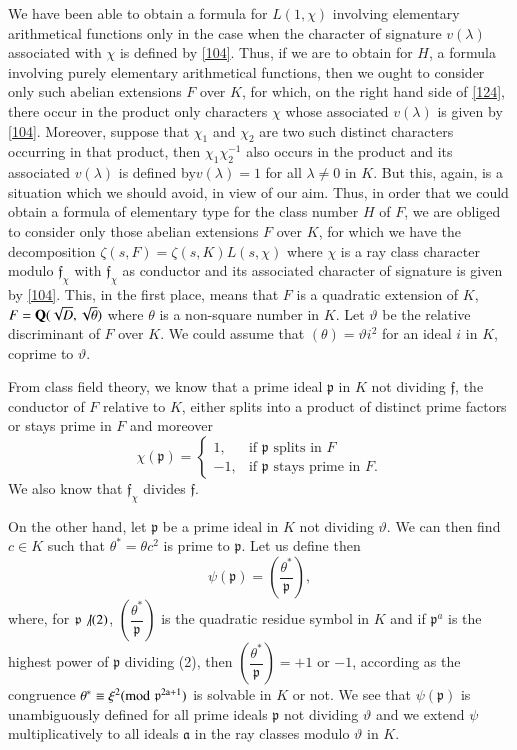 We have been able to obtain a formula for $L(1,\chi)$ involving
elementary arithmetical functions only in the case when the character
of signature $v(\lambda)$ associated with $\chi$ is defined by
\eqref{104}. Thus, if we are to obtain for $H$, a formula involving
purely elementary arithmetical functions, then we ought to consider
only such abelian extensions $F$ over $K$, for which, on the right
hand side of \eqref{124}, there occur in the product only characters
$\chi$ whose associated $v(\lambda)$ is given by
\eqref{104}. Moreover, suppose that $\chi_{1}$ and $\chi_{2}$ are two
such distinct characters occurring in that product, then
$\chi_{1}\chi^{-1}_{2}$ also occurs in the product and its associated
$v(\lambda)$ is defined by\pageoriginale $v(\lambda)=1$ for all
$\lambda\neq 0$ in $K$. But this, again, is a situation which we
should avoid, in view of our aim. Thus, in order that we could obtain
a formula of elementary type for the class number $H$ of $F$, we are
obliged to consider only those abelian extensions $F$ over $K$, for
which we have the decomposition $\zeta(s,F)=\zeta(s,K)L(s,\chi)$ where
$\chi$ is a ray class character modulo $\mathfrak{f}_{\chi}$ with
$\mathfrak{f}_{\chi}$ as conductor and its associated character of
signature is given by \eqref{104}. This, in the first place, means
that $F$ is a quadratic extension of $K$, \ie
$F=\mathbf{Q}(\sqrt{D},\sqrt{\theta})$ where $\theta$ is a non-square number
in $K$. Let $\vartheta$ be the relative discriminant of $F$ over
$K$. We could assume that $(\theta)=\vartheta i^{2}$ for an ideal $i$
in $K$, coprime to $\vartheta$.

From class field theory, we know that a prime ideal $\mathfrak{p}$ in
$K$ not dividing $\mathfrak{f}$, the conductor of $F$ relative to $K$,
either splits into a product of distinct prime factors or stays prime
in $F$ and moreover
\begin{equation*}
\chi(\mathfrak{p})=
\begin{cases}
1, & \text{if } \mathfrak{p} \text{ splits in  } F\\
-1, & \text{if } \mathfrak{p} \text{ stays prime in } F.
\end{cases}\tag{125}\label{125}
\end{equation*}
We also know that $\mathfrak{f}_{\chi}$ divides $\mathfrak{f}$.

On the other hand, let $\mathfrak{p}$ be a prime ideal in $K$ not
dividing $\vartheta$. We can then find $c\in K$ such that
$\theta^{\ast}=\theta c^{2}$ is prime to $\mathfrak{p}$. Let us define
then
$$
\psi(\mathfrak{p})=\left(\frac{\theta^{\ast}}{\mathfrak{p}}\right),
$$
where, for $\mathfrak{p}\not\vert (2)$,
$\left(\dfrac{\theta^{\ast}}{\mathfrak{p}}\right)$ is the quadratic
residue symbol in $K$ and if $\mathfrak{p}^{a}$ is the highest power
of $\mathfrak{p}$ dividing (2), then
$\left(\dfrac{\theta^{\ast}}{\mathfrak{p}}\right)=+1$ or $-1$,
  according as the congruence $\theta^{\ast}\equiv\xi^{2}(\rm{mod} \;
  \mathfrak{p}^{2a+1})$ is solvable in $K$ or not. We see that
  $\psi(\mathfrak{p})$ is unambiguously defined for all prime ideals
  $\mathfrak{p}$ not dividing $\vartheta$ and we extend $\psi$
  multiplicatively to all ideals $\mathfrak{a}$ in the ray classes
  modulo $\vartheta$ in $K$.

